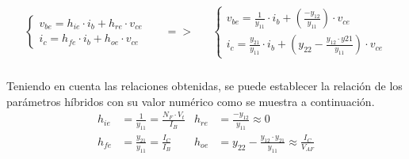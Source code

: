 \[
\begin{array}{rcl} 
      \begin{array}{l}
	 \begin{cases}
	    v_{be} = h_{ie} \cdot i_b + h_{re} \cdot v_{ce} \\
	    i_c = h_{fe} \cdot i_b + h_{oe} \cdot v_{ce}
	 \end{cases}
      \end{array}
      &
      \begin{array}{l}
	  =>
      \end{array}
      &
      \begin{array}{l}
	 \begin{cases}
	    v_{be} = \frac{1}{y_{11}} \cdot i_b + \left(\frac{-y_{12}}{y_{11}}\right) \cdot v_{ce} \\
	    i_c = \frac{y_{21}}{y_{11}} \cdot i_b + \left( y_{22} - \frac{y_{12} \cdot y{21}}{y_{11}}\right) \cdot v_{ce} 
	 \end{cases}
      \end{array}
\end{array}
\]

\paragraph{}
Teniendo en cuenta las relaciones obtenidas, se puede establecer la relación de los parámetros híbridos con su valor numérico como se muestra a continuación.
\begin{align} 
   h_{ie} &= \frac { 1 }{ y_{11} } = \frac{N_F \cdot V_t}{I_B} & h_{re} &= \frac{-y_{12}}{y_{11}} \approx 0 \label{eq:h_param1} \\
   h_{fe} &= \frac { y_{21} }{ y_{11} } = \frac{I_C}{I_B} & h_{oe} &=  y_{22} - \frac{y_{12} \cdot y_{21}}{y_{11}}\approx \frac{I_C}{V_{AF}} \label{eq:h_param2}
\end{align}

